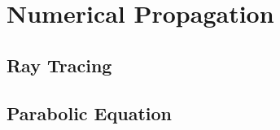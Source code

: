 \renewcommand{\baselinestretch}{2} \small\normalsize
\chapter{Numerical Propagation}

\section{Ray Tracing}
\section{Parabolic Equation}